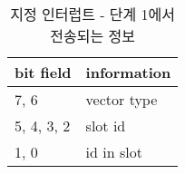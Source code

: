%
%
\begin{table}[htbp]
\caption{지정 인터럽트 - 단계 1에서 전송되는 정보}\label{table:dir-int-p1}
   \begin{center}
   \begin{tabular}{|l|l|} \hline
	bit field & information \\
\hline \hline
	7, 6 & vector type \\
	5, 4, 3, 2 & slot id \\
	1, 0 & id in slot \\
\hline
   \end{tabular}
   \end{center}
\end{table}
%
%
